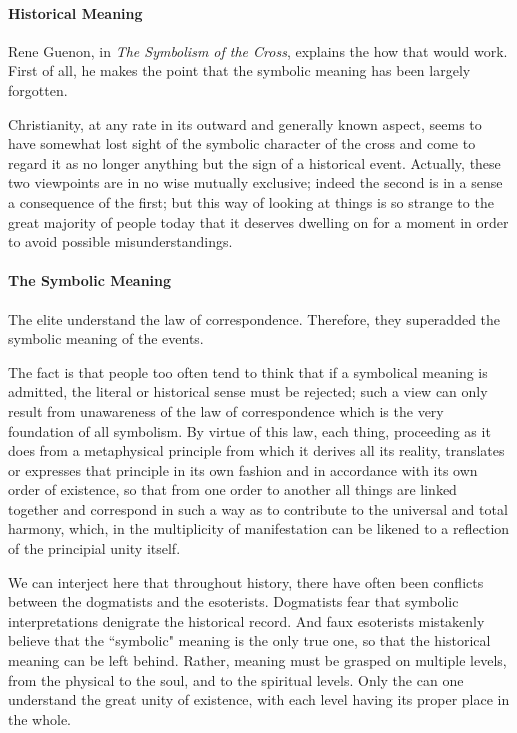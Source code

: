 \paragraph{Historical Meaning}
Rene Guenon, in \emph{The Symbolism of the Cross}, explains the how that would work. First of all, he makes the point that the symbolic meaning has been largely forgotten.

\begin{quotex}
Christianity, at any rate in its outward and generally known aspect, seems to have somewhat lost sight of the symbolic character of the cross and come to regard it as no longer anything but the sign of a historical event. Actually, these two viewpoints are in no wise mutually exclusive; indeed the second is in a sense a consequence of the first; but this way of looking at things is so strange to the great majority of people today that it deserves dwelling on for a moment in order to avoid possible misunderstandings. 

\end{quotex}
\paragraph{The Symbolic Meaning}
The elite understand the law of correspondence. Therefore, they superadded the symbolic meaning of the events.

\begin{quotex}
The fact is that people too often tend to think that if a symbolical meaning is admitted, the literal or historical sense must be rejected; such a view can only result from unawareness of the law of correspondence which is the very foundation of all symbolism. By virtue of this law, each thing, proceeding as it does from a metaphysical principle from which it derives all its reality, translates or expresses that principle in its own fashion and in accordance with its own order of existence, so that from one order to another all things are linked together and correspond in such a way as to contribute to the universal and total harmony, which, in the multiplicity of manifestation can be likened to a reflection of the principial unity itself. 

\end{quotex}
We can interject here that throughout history, there have often been conflicts between the dogmatists and the esoterists. Dogmatists fear that symbolic interpretations denigrate the historical record. And faux esoterists mistakenly believe that the ``symbolic" meaning is the only true one, so that the historical meaning can be left behind. Rather, meaning must be grasped on multiple levels, from the physical to the soul, and to the spiritual levels. Only the can one understand the great unity of existence, with each level having its proper place in the whole.

